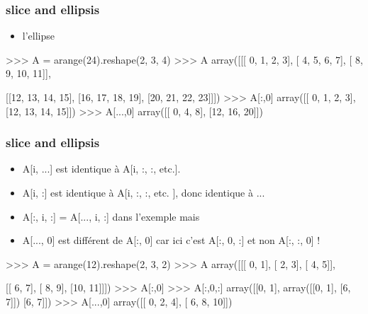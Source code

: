 \begin{frame}[fragile]
\frametitle{slice and ellipsis}
\begin{itemize}
 \item l'ellipse  
\end{itemize}
\begin{pythonConsole}
>>> A = arange(24).reshape(2, 3, 4)
>>> A
array([[[ 0,  1,  2,  3],
        [ 4,  5,  6,  7],
        [ 8,  9, 10, 11]],

       [[12, 13, 14, 15],
        [16, 17, 18, 19],
        [20, 21, 22, 23]]])
>>> A[:,0]
array([[ 0,  1,  2,  3],
       [12, 13, 14, 15]])
>>> A[...,0]
array([[ 0,  4,  8],
       [12, 16, 20]])
\end{pythonConsole}
\end{frame}
\begin{frame}[fragile]
\frametitle{slice and ellipsis}
\begin{itemize}
 \item A[i, ...] est identique à A[i, :, :, etc.].
 \item A[i, :] est identique à A[i, :, :, etc. ], donc identique à ... 
 \item A[:, i, :] = A[..., i, :] dans l'exemple mais 
 \item A[..., 0] est différent de A[:, 0] car ici c'est A[:, 0, :] et non A[:, :, 0] ! 
\end{itemize}
\begin{pythonConsole}
>>> A = arange(12).reshape(2, 3, 2)
>>>  A
array([[[ 0,  1],
        [ 2,  3],
        [ 4,  5]],

       [[ 6,  7],
        [ 8,  9],
        [10, 11]]])
>>> A[:,0]                       >>> A[:,0,:] 
array([[0, 1],                   array([[0, 1],
       [6, 7]])                         [6, 7]]) 
>>> A[...,0]
array([[ 0,  2,  4],
       [ 6,  8, 10]])
\end{pythonConsole}
\end{frame}
